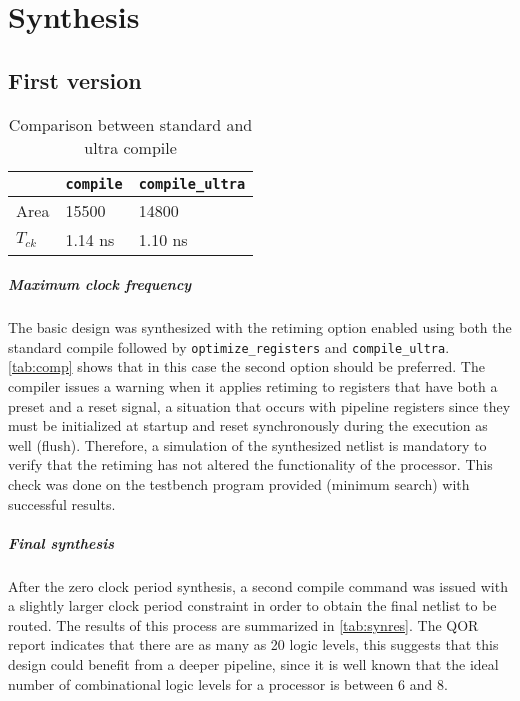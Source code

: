 \chapter{Synthesis}
\section{First version}
\begin{table}[h]
	\centering
\begin{tabular}{|l|l|l|}
	\hline
	& \texttt{compile} & \texttt{compile\_ultra}\\\hline
	Area & 15500 & 14800 \\\hline
	$T_{ck}$& 1.14 ns & 1.10 ns\\\hline
\end{tabular}
\caption{Comparison between standard and ultra compile}
\label{tab:comp}
\end{table}

\paragraph{Maximum clock frequency} The basic design was synthesized with the retiming option enabled using both the standard compile followed by \texttt{optimize\_registers} and \texttt{compile\_ultra}. \autoref{tab:comp} shows that in this case the second option should be preferred. The compiler issues a warning when it applies retiming to registers that have both a preset and a reset signal, a situation that occurs with pipeline registers since they must be initialized at startup and reset synchronously during the execution as well (flush). Therefore, a simulation of the synthesized netlist is mandatory to verify that the retiming has not altered the functionality of the processor. This check was done on the testbench program provided (minimum search) with successful results.

\paragraph{Final synthesis} After the zero clock period synthesis, a second compile command was issued with a slightly larger clock period constraint in order to obtain the final netlist to be routed. The results of this process are summarized in \autoref{tab:synres}. The QOR report indicates that there are as many as 20 logic levels, this suggests that this design could benefit from a deeper pipeline, since it is well known that the ideal number of combinational logic levels for a processor is between 6 and 8.

